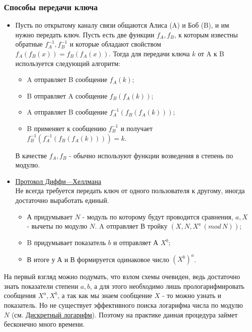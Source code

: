 \subsubsection{Способы передачи ключа}

\begin {itemize}
\item Пусть по открытому каналу связи общаются Алиса (A) и Боб (B), и им нужно передать ключ. Пусть есть две функции $f_{A}, f_{B}$, к которым известны обратные $f^{-1}_{A}, f^{-1}_{B}$ и которые обладают свойством $f_{A} (f_{B} (x)) = f_{B} (f_{A} (x))$. Тогда для передачи ключа $k$ от A к B используется следующий алгоритм:
\begin {itemize}
\item A отправляет B сообщение $f_{A} (k)$;
\item B отправляет A сообщение $f_{B}(f_{A} (k))$;
\item A отправляет B сообщение $f^{-1}_{A}(f_{B}(f_{A} (k)))$;
\item B применяет к сообщению $f^{-1}_{B}$ и получает $f^{-1}_{B}(f^{-1}_{A}(f_{B}(f_{A} (k)))) = k$.
\end {itemize}
В качестве $f_{A}, f_{B}$ - обычно используют функции возведения в степень по модулю. \\

\item \href{https://clck.ru/9rNPo} {Протокол Диффи—Хеллмана}\\
Не всегда требуется передать ключ от одного пользователя к другому, иногда достаточно выработать единый. 
\begin {itemize}
\item А придумывает $N$ - модуль по которому будут проводится сравнения, $a, X$ - вычеты по модулю $N$. A отправляет В тройку $(X, N, X^{a} \, (mod \, N))$;
\item B придумывает показатель $b$ и отправляет А $X^{b}$;
\item В итоге у А и В формируется одинаковое число $\left( X^{b} \right)^{a}$.
\end {itemize}
\end{itemize}
На первый взгляд можно подумать, что взлом схемы очевиден, ведь достаточно знать показатели степени $a, b$, а для этого необходимо лишь прологарифмировать сообщения $X^a, X^b$, а так как мы знаем сообщение $X$ - то можно узнать и показатель. Но не существует эффективного поиска логарифма числа по модулю $N$ (см. \href{https://clck.ru/pv4S6}{Дискретный логарифм}). Поэтому на практике данная процедура займет бесконечно много времени.


